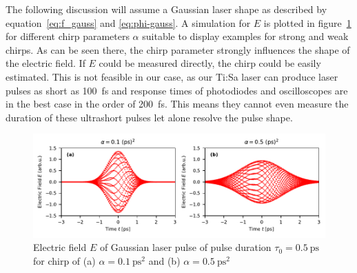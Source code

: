 The following discussion will assume a Gaussian laser shape as described by equation~\eqref{eq:f_gauss} and \eqref{eq:phi-gauss}.
A simulation for $E$ is plotted in figure~\ref{fig:chirpedlaserpulse} for different chirp parameters $\alpha$ suitable to display examples for strong and weak chirps.
As can be seen there, the chirp parameter strongly influences the shape of the electric field.
If $E$ could be measured directly, the chirp could be easily estimated.
This is not feasible in our case, as our Ti:Sa laser can produce laser pulses as short as \SI{100}{\femto \second} and response times of photodiodes and oscilloscopes are in the best case in the order of \SI{200}{\femto \second}.
This means they cannot even measure the duration of these ultrashort pulses let alone resolve the pulse shape.

\begin{figure}[H]
	\centering
	\includegraphics[width=\linewidth]{figures/chirp/plots/chirped_laser_pulse}
	\caption{Electric field $E$ of Gaussian laser pulse of pulse duration $\tau_0=\SI{0.5}{\pico \second}$ for chirp of (a) $\alpha = \SI{0.1}{\pico \second \squared}$ and (b) $\alpha = \SI{0.5}{\pico \second \squared}$}
	\label{fig:chirpedlaserpulse}
\end{figure}

\newpage

